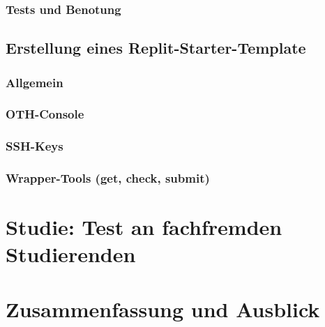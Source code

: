 \documentclass[a4paper,12pt]{article}
\begin{document}
\subsubsection{Tests und Benotung}
\subsection{Erstellung eines Replit-Starter-Template}
\subsubsection{Allgemein}
\subsubsection{OTH-Console}
\subsubsection{SSH-Keys}
\subsubsection{Wrapper-Tools (get, check, submit)}
\section{Studie: Test an fachfremden Studierenden}
\section{Zusammenfassung und Ausblick}
\newpage

\setcounter{page}{3}


\newpage
\end{document}
